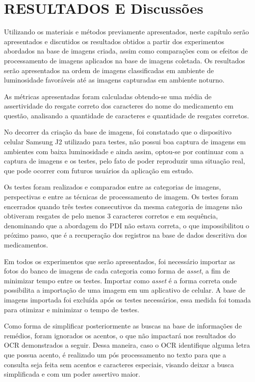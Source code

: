 \chapter{RESULTADOS E Discussões}\label{ch:intro}
Utilizando os materiais e métodos previamente apresentados, neste capítulo serão
apresentados e discutidos os resultados obtidos a partir dos experimentos abordados na base de imagens criada, assim como comparações com os efeitos de processamento de imagens aplicados na base de imagens coletada. Os resultados serão apresentados na ordem de imagens classificadas em ambiente de luminosidade favoráveis até as imagens capturadas em ambiente noturno.


As métricas apresentadas foram calculadas obtendo-se uma média de assertividade do resgate correto dos caracteres do nome do medicamento em questão, analisando a quantidade de caracteres e quantidade de resgates corretos.

 No decorrer da criação da base de imagens, foi constatado que o dispositivo celular Samsung J2 utilizado para testes, não possui boa captura de imagens em ambientes com baixa luminosidade e ainda assim, optou-se por continuar com a captura de imagens e os testes, pelo fato de poder reproduzir uma situação real, que pode ocorrer com futuros usuários da aplicação em estudo.
 
Os testes foram realizados e comparados entre as categorias de imagens, perspectivas e entre as técnicas de processamento de imagem. Os testes foram encerrados quando três testes consecutivos da mesma categoria de imagens não obtiveram resgates de pelo menos 3 caracteres corretos e em sequência, denominando que a abordagem do PDI não estava correta, o que impossibilitou o próximo passo, que é a recuperação dos registros na base de dados descritiva dos medicamentos.


Em todos os experimentos que serão apresentados, foi necessário importar as fotos do banco de imagens de cada categoria como forma de \textit{asset}, a fim de minimizar tempo entre os testes. Importar como \textit{asset} é a forma correta onde possibilita a importação de uma imagem em um aplicativo de celular. A base de imagens importada foi excluída após os testes necessários, essa medida foi tomada para otimizar e minimizar o tempo de testes.

Como forma de simplificar posteriormente as buscas na base de informações de remédios, foram ignorados os acentos, o que não impactará nos resultados do OCR demonstrados a seguir. Dessa maneira, caso o OCR identifique alguma letra que possua acento, é realizado um pós processamento no texto para que a consulta seja feita sem acentos e caracteres especiais, visando deixar a busca simplificada e com um poder assertivo maior.

